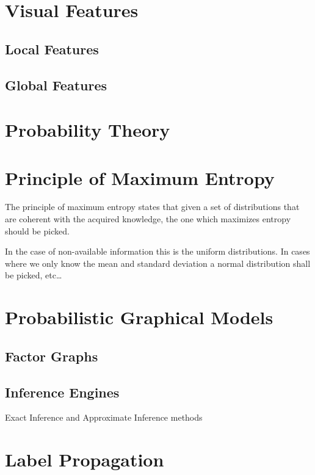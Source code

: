 \section{Visual Features}
\subsection{Local Features}
\subsection{Global Features}

\section{Probability Theory}


\section{Principle of Maximum Entropy}
The principle of maximum entropy states that given a set of distributions that
are coherent with the acquired knowledge, the one which maximizes entropy should
be picked.

In the case of non-available information this is the uniform distributions.
In cases where we only know the mean and standard deviation a normal
distribution shall be picked, etc\dots

\section{Probabilistic Graphical Models}
\label{sec:graphical-models}
\subsection{Factor Graphs}
\subsection{Inference Engines}
Exact Inference and Approximate Inference methods

\section{Label Propagation}

